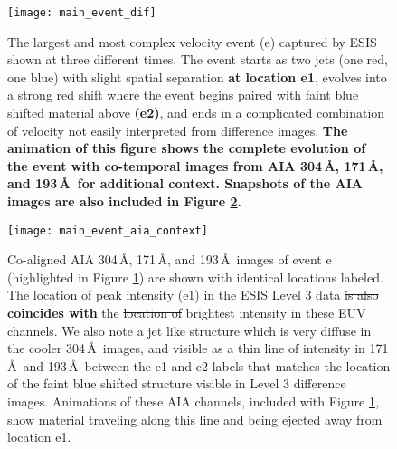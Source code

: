     	
    	\begin{figure}
    		\begin{center}
    			\texttt{[image: main\_event\_dif]}
    			\caption{The largest and most complex velocity event (e) %
    				captured by ESIS shown at three different times. The event starts as two jets (one red, one blue) with slight spatial separation \textbf{at location e1}, evolves into a strong red shift where the event begins paired with faint blue shifted material above \textbf{(e2)}, and ends in a complicated combination of velocity not easily interpreted from difference images. 
					\textbf{The animation of this figure shows the complete evolution of the event with co-temporal images from AIA 304\,\AA, 171\,\AA, and 193\,\AA\ for additional context.
					Snapshots of the AIA images are also included in Figure \ref{fig:main_event_aia}.}
    			}
    			\label{fig:main_event}
    		\end{center}
    		
    	\end{figure}
    
   		\begin{figure}
    		\texttt{[image: main\_event\_aia\_context]}
    		\centering
    		\caption{Co-aligned AIA 304\,\AA, 171\,\AA, and 193\,\AA\ images of event e  (highlighted in Figure \ref{fig:main_event}) are shown with identical locations labeled. The location of peak intensity (e1) in the ESIS Level 3 data \sout{is also} \textbf{coincides with} the \sout{location of} brightest intensity in these EUV channels. We also note a jet like structure which is very diffuse in the cooler 304\,\AA\ images, and visible as a thin line of intensity in 171\,\AA \ and 193\,\AA \ between the e1 and e2 labels that matches the location of the faint blue shifted structure visible in Level 3 difference images. Animations of these AIA channels, included with Figure \ref{fig:main_event}, show material traveling along this line and being ejected away from location e1.}
    		\label{fig:main_event_aia}
    	\end{figure}
		
